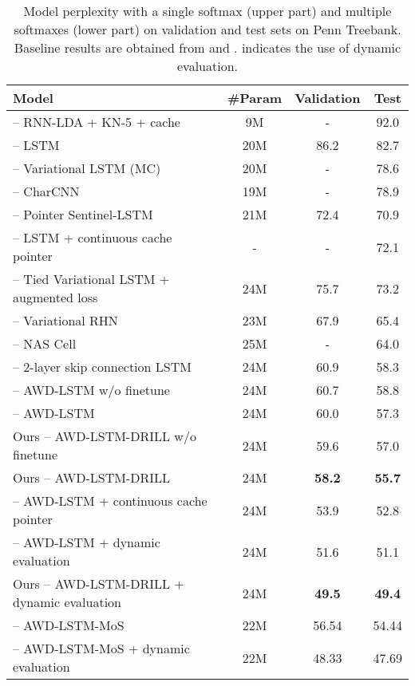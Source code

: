 \documentclass{article}
\begin{document}
\begin{table*}[ht]\small
	\centering
	\begin{tabular}{l|ccc}
		\toprule
		\bf Model & \bf \#Param & \bf Validation &  \bf Test \\
		\midrule
		\citet{mikolov2012context} -- RNN-LDA + KN-5 + cache & 9M & - & 92.0 \\
		\citet{zaremba2014recurrent} -- LSTM & 20M & 86.2 & 82.7 \\
		\citet{gal2016theoretically} -- Variational LSTM (MC) & 20M & - & 78.6 \\
		\citet{kim2016character} -- CharCNN & 19M & - & 78.9 \\
		\citet{merity2016pointer} -- Pointer Sentinel-LSTM & 21M & 72.4 & 70.9 \\
		\citet{grave2016improving} -- LSTM + continuous cache pointer & - & - & 72.1 \\
		\citet{inan2016tying} -- Tied Variational LSTM + augmented loss & 24M & 75.7 & 73.2 \\
		\citet{zilly2016recurrent} -- Variational RHN & 23M & 67.9 & 65.4 \\
		\citet{zoph2016neural} -- NAS Cell & 25M & - & 64.0 \\
		\citet{melis2017state} -- 2-layer skip connection LSTM & 24M & 60.9 & 58.3 \\
		\midrule
		\citet{merity2017regularizing} -- AWD-LSTM w/o finetune & 24M & 60.7 & 58.8 \\\citet{merity2017regularizing} -- AWD-LSTM & 24M & 60.0 & 57.3 \\
		Ours -- AWD-LSTM-DRILL w/o finetune & 24M & 59.6 & 57.0 \\Ours -- AWD-LSTM-DRILL  & 24M & \textbf{58.2} & \textbf{55.7} \\

		\midrule
	
		\citet{merity2017regularizing} -- AWD-LSTM + continuous cache pointer & 24M & 53.9 & 52.8 \\
		\citet{krause2017dynamic} -- AWD-LSTM + dynamic evaluation & 24M & 51.6 & 51.1 \\
		Ours -- AWD-LSTM-DRILL + dynamic evaluation & 24M & \textbf{49.5} & \textbf{49.4}  \\

		\midrule \midrule
		\citet{mos2018} -- AWD-LSTM-MoS & 22M & {56.54} & {54.44} \\
		\citet{mos2018} -- AWD-LSTM-MoS + dynamic evaluation & 22M & {48.33} & {47.69} \\
		\bottomrule
	\end{tabular}
	\vspace{-2mm}
	\caption{\small
		Model perplexity with a single softmax (upper part) and multiple softmaxes (lower part) on validation and test sets on Penn Treebank. Baseline results are obtained from \citet{merity2017regularizing} and \citet{krause2017dynamic}.  indicates the use of dynamic evaluation.
	}
		\vspace{-4mm}
	\label{table:PTB}
\end{table*} 
\end{document}
